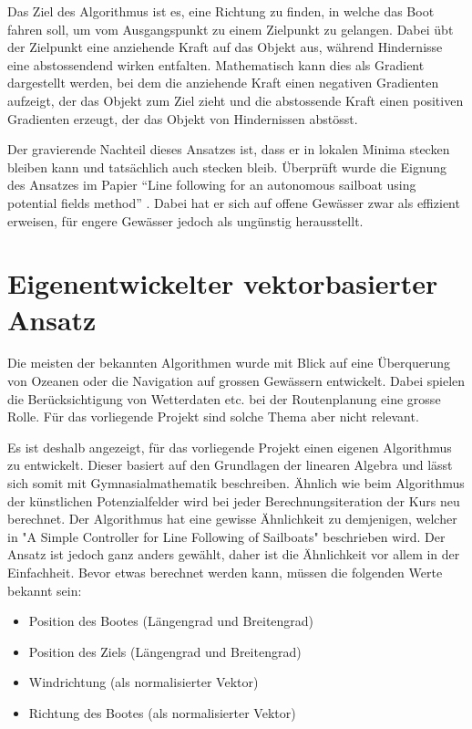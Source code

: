 Das Ziel des Algorithmus ist es, eine Richtung zu finden, in welche das Boot fahren soll, um vom Ausgangspunkt zu einem Zielpunkt zu gelangen. Dabei übt der Zielpunkt eine anziehende Kraft auf das Objekt aus, während Hindernisse eine abstossendend wirken entfalten. Mathematisch kann dies als Gradient dargestellt werden, bei dem die anziehende Kraft einen negativen Gradienten aufzeigt, der das Objekt zum Ziel zieht und die abstossende Kraft einen positiven Gradienten erzeugt, der das Objekt von Hindernissen abstösst.

Der gravierende Nachteil dieses Ansatzes ist, dass er in lokalen Minima stecken bleiben kann und tatsächlich auch stecken bleib. Überprüft wurde die Eignung des Ansatzes im Papier \enquote{Line following for an autonomous sailboat using potential ﬁelds method} \cite{inproceedings} . Dabei hat er sich auf offene Gewässer zwar als effizient erweisen, für engere Gewässer jedoch als ungünstig herausstellt.
\section{Eigenentwickelter vektorbasierter Ansatz}
Die meisten der bekannten Algorithmen wurde mit Blick auf eine Überquerung von Ozeanen oder die Navigation auf grossen Gewässern entwickelt. Dabei spielen die Berücksichtigung von Wetterdaten etc. bei der Routenplanung eine grosse Rolle. Für das vorliegende Projekt sind solche Thema aber nicht relevant. 

Es ist deshalb angezeigt, für das vorliegende Projekt einen eigenen Algorithmus zu entwickelt. Dieser basiert auf den Grundlagen der linearen Algebra und lässt sich somit mit Gymnasialmathematik beschreiben. Ähnlich wie beim Algorithmus der künstlichen Potenzialfelder wird bei jeder Berechnungsiteration der Kurs neu berechnet. Der Algorithmus hat eine gewisse Ähnlichkeit zu demjenigen, welcher in "A Simple Controller for Line Following of Sailboats" beschrieben wird. \cite{inproceedings}
Der Ansatz ist jedoch ganz anders gewählt, daher ist die Ähnlichkeit vor allem in der Einfachheit.
Bevor etwas berechnet werden kann, müssen die folgenden Werte bekannt sein:
\begin{itemize}
    \item Position des Bootes (Längengrad und Breitengrad)
    \item Position des Ziels (Längengrad und Breitengrad)
    \item Windrichtung (als normalisierter Vektor)
    \item Richtung des Bootes (als normalisierter Vektor)
    
\end{itemize}

